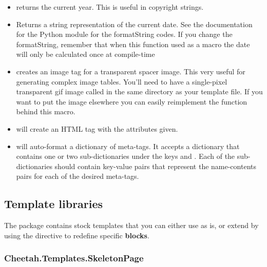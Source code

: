 \begin{itemize}
\item {\bf {}} returns the current year. This is useful in
     copyright strings.
\item {\bf {}} Returns a string
   representation of the current date. See the documentation for the Python
    module for the formatString codes. If you change the
   formatString, remember that when this function used as a macro the date
   will only be calculated once at compile-time
\item {\bf {}} creates an image tag for a
     transparent spacer image. This very useful for generating complex image
     tables. You'll need to have a single-pixel transparent gif image called
      in the same directory as your template file.  If you want
     to put the image elsewhere you can easily reimplement the function behind
     this macro.
\item {\bf {}} will create an HTML tag
     with the attributes given.
     
\item {\bf {}} will auto-format a dictionary of
     meta-tags.  It accepts a dictionary that contains one or two
     sub-dictionaries under the keys  and . Each of
     the sub-dictionaries should contain key-value pairs that represent the
     name-contents pairs for each of the desired meta-tags.
\end{itemize}
            

\subsection{Template libraries}
\label{libraries.templates}

The  package contains stock templates that you can
either use as is, or extend by using the  directive to redefine
specific {\bf blocks}.

\subsubsection{Cheetah.Templates.SkeletonPage}
\label{libraries.templates.skeletonPage}

